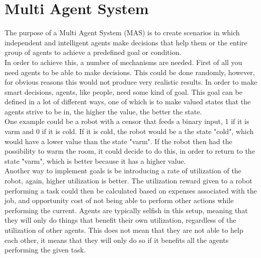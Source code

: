 \section{Multi Agent System}
The purpose of a Multi Agent System (MAS) is to create scenarios in which independent and intelligent agents make decisions that help them or the entire group of agents to achieve a predefined goal or condition.\\
\indent In order to achieve this, a number of mechanisms are needed. First of all you need agents to be able to make decisions. This could be done randomly, however, for obvious reasons this would not produce very realistic results. In order to make smart decisions, agents, like people, need some kind of goal. This goal can be defined in a lot of different ways, one of which is to make valued states that the agents strive to be in, the higher the value, the better the state.\\
\indent One example could be a robot with a censor that feeds a binary input, 1 if it is varm and 0 if it is cold. If it is cold, the robot would be a the state "cold", which would have a lower value than the state "varm". If the robot then had the possibility to warm the room, it could decide to do this, in order to return to the state "varm", which is better because it has a higher value.\\
\indent Another way to implement goals is be introducing a rate of utilization of the robot, again, higher utilization is better. The utilization reward given to a robot performing a task could then be calculated based on expenses associated with the job, and opportunity cost of not being able to perform other actions while performing the current. Agents are typically selfish in this setup, meaning that they will only do things that benefit their own utilization, regardless of the utilization of other agents. This does not mean that they are not able to help each other, it means that they will only do so if it benefits all the agents performing the given task.